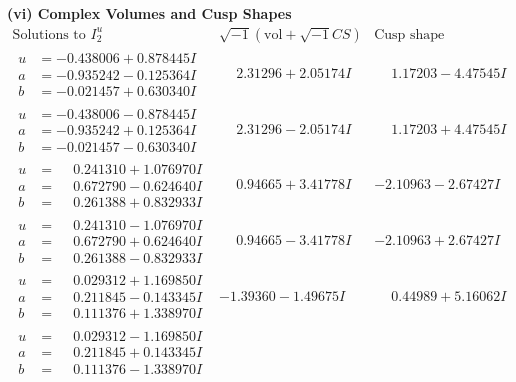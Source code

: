 \documentclass[1p]{elsarticle_modified}
\theoremstyle{definition}
\newcommand{\I}{\sqrt{-1}}
\begin{document}
\newpage\flushleft \textbf{(vi) Complex Volumes and Cusp Shapes}
$$\begin{array}{c|c|c}  
\text{Solutions to }I^u_{2}& \I (\text{vol} + \sqrt{-1}CS) & \text{Cusp shape}\\
 \hline 
\begin{aligned}
u &= -0.438006 + 0.878445 I \\
a &= -0.935242 - 0.125364 I \\
b &= -0.021457 + 0.630340 I\end{aligned}
 & \phantom{-}2.31296 + 2.05174 I & \phantom{-}1.17203 - 4.47545 I \\ \hline\begin{aligned}
u &= -0.438006 - 0.878445 I \\
a &= -0.935242 + 0.125364 I \\
b &= -0.021457 - 0.630340 I\end{aligned}
 & \phantom{-}2.31296 - 2.05174 I & \phantom{-}1.17203 + 4.47545 I \\ \hline\begin{aligned}
u &= \phantom{-}0.241310 + 1.076970 I \\
a &= \phantom{-}0.672790 - 0.624640 I \\
b &= \phantom{-}0.261388 + 0.832933 I\end{aligned}
 & \phantom{-}0.94665 + 3.41778 I & -2.10963 - 2.67427 I \\ \hline\begin{aligned}
u &= \phantom{-}0.241310 - 1.076970 I \\
a &= \phantom{-}0.672790 + 0.624640 I \\
b &= \phantom{-}0.261388 - 0.832933 I\end{aligned}
 & \phantom{-}0.94665 - 3.41778 I & -2.10963 + 2.67427 I \\ \hline\begin{aligned}
u &= \phantom{-}0.029312 + 1.169850 I \\
a &= \phantom{-}0.211845 - 0.143345 I \\
b &= \phantom{-}0.111376 + 1.338970 I\end{aligned}
 & -1.39360 - 1.49675 I & \phantom{-}0.44989 + 5.16062 I \\ \hline\begin{aligned}
u &= \phantom{-}0.029312 - 1.169850 I \\
a &= \phantom{-}0.211845 + 0.143345 I \\
b &= \phantom{-}0.111376 - 1.338970 I\end{aligned}

\end{array}$$
\end{document}
